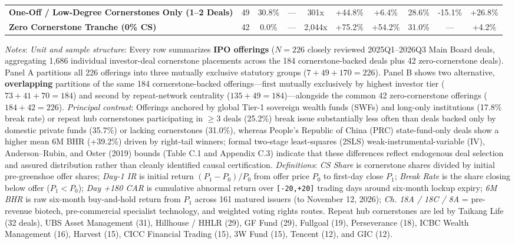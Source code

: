\documentclass[11pt,letterpaper]{article}
\begin{document}
\begin{table}[!htbp]
\begin{adjustbox}{max width=\textwidth,max totalheight=0.79\textheight}
\begin{minipage}{\textwidth}
\begin{adjustbox}{max width=\textwidth}
\begin{tabular}{>{\raggedright\arraybackslash}p{6.20cm}ccccccccc}
\textbf{One-Off / Low-Degree Cornerstones Only (1–2 Deals)} & 49 & 30.8\% & — & 301x & +44.8\% & +6.4\% & 28.6\% & -15.1\% & +26.8\% \\
\textbf{Zero Cornerstone Tranche (0\% CS)} & 42 & 0.0\% & — & 2,044x & +75.2\% & +54.2\% & 31.0\% & — & +4.2\% \\
\bottomrule
\end{tabular}
\end{adjustbox}
\end{minipage}
\end{adjustbox}
\par\vspace{3pt}\noindent\parbox{\textwidth}{\scriptsize\raggedright \textit{Notes}: \textit{Unit and sample structure}: Every row summarizes \textbf{IPO offerings} ($N = 226$ closely reviewed 2025Q1–2026Q3 Main Board deals, aggregating 1,686 individual investor-deal cornerstone placements across the 184 cornerstone-backed deals plus 42 zero-cornerstone deals). Panel A partitions all 226 offerings into three mutually exclusive statutory groups ($7 + 49 + 170 = 226$). Panel B shows two alternative, \textbf{overlapping} partitions of the same 184 cornerstone-backed offerings—first mutually exclusively by highest investor tier ($73 + 41 + 70 = 184$) and second by repeat-network centrality ($135 + 49 = 184$)—alongside the common 42 zero-cornerstone offerings ($184 + 42 = 226$). \textit{Principal contrast}: Offerings anchored by global Tier-1 sovereign wealth funds (SWFs) and long-only institutions (17.8\% break rate) or repeat hub cornerstones participating in $\ge 3$ deals (25.2\%) break issue substantially less often than deals backed only by domestic private funds (35.7\%) or lacking cornerstones (31.0\%), whereas People's Republic of China (PRC) state-fund-only deals show a higher mean 6M BHR (+39.2\%) driven by right-tail winners; formal two-stage least-squares (2SLS) weak-instrumental-variable (IV), Anderson–Rubin, and Oster (2019) bounds (Table C.1 and Appendix C.3) indicate that these differences reflect endogenous deal selection and assured distribution rather than cleanly identified causal certification. \textit{Definitions}: \textit{CS Share} is cornerstone shares divided by initial pre-greenshoe offer shares; \textit{Day-1 IR} is initial return $(P_1 - P_0)/P_0$ from offer price $P_0$ to first-day close $P_1$; \textit{Break Rate} is the share closing below offer ($P_1 < P_0$); \textit{Day +180 CAR} is cumulative abnormal return over \texttt{\small [-20,+20]} trading days around six-month lockup expiry; \textit{6M BHR} is raw six-month buy-and-hold return from $P_1$ across 161 matured issuers (to November 12, 2026); \textit{Ch. 18A / 18C / 8A} = pre-revenue biotech, pre-commercial specialist technology, and weighted voting rights routes. Repeat hub cornerstones are led by Taikang Life (32 deals), UBS Asset Management (31), Hillhouse / HHLR (29), GF Fund (29), Fullgoal (19), Perseverance (18), ICBC Wealth Management (16), Harvest (15), CICC Financial Trading (15), 3W Fund (15), Tencent (12), and GIC (12).}

\end{table}
\end{document}
